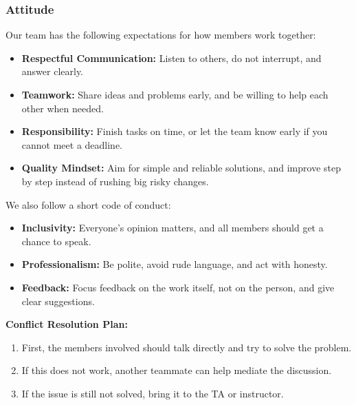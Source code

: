 \documentclass{article}
\begin{document}

\subsubsection*{Attitude}

Our team has the following expectations for how members work together:

\begin{itemize}
  \item \textbf{Respectful Communication:} Listen to others, do not interrupt, and answer clearly.
  \item \textbf{Teamwork:} Share ideas and problems early, and be willing to help each other when needed.
  \item \textbf{Responsibility:} Finish tasks on time, or let the team know early if you cannot meet a deadline.
  \item \textbf{Quality Mindset:} Aim for simple and reliable solutions, and improve step by step instead of rushing big risky changes.
\end{itemize}

We also follow a short code of conduct:

\begin{itemize}
  \item \textbf{Inclusivity:} Everyone's opinion matters, and all members should get a chance to speak.
  \item \textbf{Professionalism:} Be polite, avoid rude language, and act with honesty.
  \item \textbf{Feedback:} Focus feedback on the work itself, not on the person, and give clear suggestions.
\end{itemize}

\textbf{Conflict Resolution Plan:}
\begin{enumerate}
  \item First, the members involved should talk directly and try to solve the problem.
  \item If this does not work, another teammate can help mediate the discussion.
  \item If the issue is still not solved, bring it to the TA or instructor.
\end{enumerate}
\end{document}
